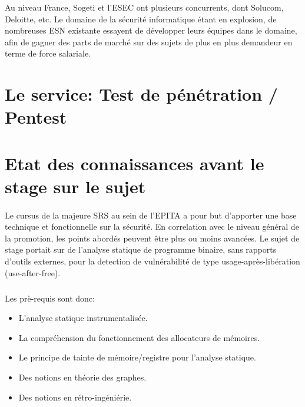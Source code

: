 Au niveau France, Sogeti et l'ESEC ont plusieurs concurrents, dont Solucom, Deloitte,
etc. Le domaine de la sécurité informatique étant en explosion, de nombreuses ESN existante
essayent de développer leurs équipes dans le domaine, afin de gagner des parts de marché
sur des sujets de plus en plus demandeur en terme de force salariale.


\paragraph{}
\subparagraph{}
\section*{Le service: Test de pénétration / Pentest}

\subparagraph{}

\section*{Etat des connaissances avant le stage sur le sujet}
\paragraph{}
Le cursus de la majeure SRS au sein de l'EPITA a pour but d'apporter une base technique et fonctionnelle
sur la sécurité. En correlation avec le niveau général de la promotion, les points abordés peuvent être
plus ou moins avancées. Le sujet de stage portait sur de l'analyse statique de programme binaire, sans rapports
d'outils externes, pour la detection de vulnérabilité de type usage-après-libération (use-after-free).
\subparagraph{}
Les prè-requis sont donc:
\begin{itemize}
\item L'analyse statique instrumentalisée.
\item La compréhension du fonctionnement des allocateurs de mémoires.
\item Le principe de tainte de mémoire/registre pour l'analyse statique.
\item Des notions en théorie des graphes.
\item Des notions en rétro-ingéniérie.
\end{itemize}

